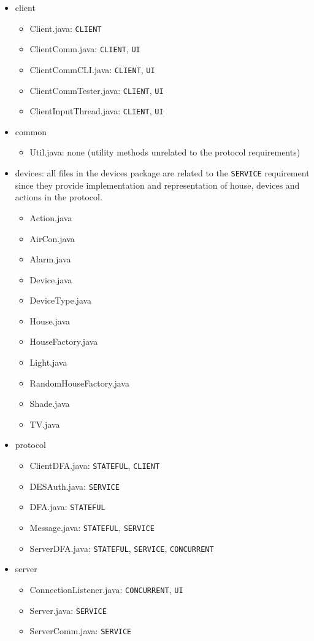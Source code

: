 \documentclass[12pt]{usenixsubmit}
\begin{document}
\begin{itemize}

\item client
    \begin{itemize}
    \item Client.java: {\tt CLIENT}
    \item ClientComm.java: {\tt CLIENT}, {\tt UI}
    \item ClientCommCLI.java: {\tt CLIENT}, {\tt UI}
    \item ClientCommTester.java: {\tt CLIENT}, {\tt UI}
    \item ClientInputThread.java: {\tt CLIENT}, {\tt UI}
    \end{itemize}

\item common
    \begin{itemize}
    \item Util.java: none (utility methods unrelated to the protocol requirements)
    \end{itemize}
    
\item devices: all files in the devices package are related to the {\tt SERVICE} requirement since they provide implementation and representation of house, devices and actions in the protocol.
    \begin{itemize}
    \item Action.java
    \item AirCon.java
    \item Alarm.java
    \item Device.java
    \item DeviceType.java
    \item House.java
    \item HouseFactory.java
    \item Light.java
    \item RandomHouseFactory.java
    \item Shade.java
    \item TV.java
    \end{itemize}
    
\item protocol
    \begin{itemize}
    \item ClientDFA.java: {\tt STATEFUL}, {\tt CLIENT}
    \item DESAuth.java: {\tt SERVICE}
    \item DFA.java: {\tt STATEFUL}
    \item Message.java: {\tt STATEFUL}, {\tt SERVICE}
    \item ServerDFA.java: {\tt STATEFUL}, {\tt SERVICE}, {\tt CONCURRENT}
    \end{itemize}
    
\item server
    \begin{itemize}
    \item ConnectionListener.java: {\tt CONCURRENT}, {\tt UI}
    \item Server.java: {\tt SERVICE}
    \item ServerComm.java: {\tt SERVICE}
    \end{itemize}

\end{itemize}
\end{document}
